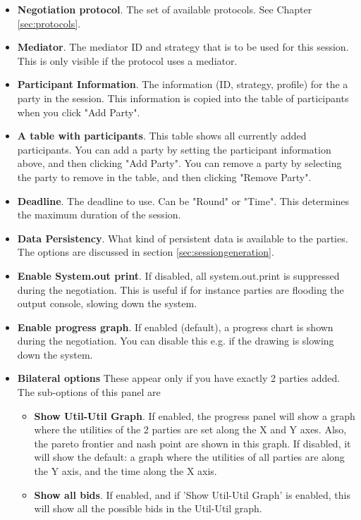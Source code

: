 \documentclass[]{article}
\begin{document}
\medskip
\begin{minipage}{.8 \textwidth}
\begin{itemize}
	\item \textbf{Negotiation protocol}. The set of available protocols. See Chapter \ref{sec:protocols}.
	\item \textbf{Mediator}. The mediator ID and strategy that is to be used for this session. This is only visible if the protocol uses a mediator.
	\item \textbf{Participant Information}. The information (ID, strategy, profile) for the a party in the session. This information is copied into the table of participants when you click "Add Party".
	\item \textbf{A table with participants}. This table shows all currently added participants. You can add a party by setting the participant information above, and then clicking "Add Party". You can remove a party by selecting the party to remove in the table, and then clicking "Remove Party". 
	\item \textbf{Deadline}. The deadline to use. Can be "Round" or "Time". This determines the maximum duration of the session.
	\item \textbf{Data Persistency}. What kind of persistent data is available to the parties. The options are discussed in section \ref{sec:sessiongeneration}.
	\item \textbf{Enable System.out print}. If disabled, all system.out.print is suppressed during the negotiation. This is useful if for instance parties are flooding the output console, slowing down the system.
		\item \textbf{Enable progress graph}. If enabled (default), a progress chart is shown during the negotiation. You can disable this e.g. if the drawing is slowing down the system.
\item \textbf{Bilateral options} These appear only if you have exactly 2 parties added. The sub-options of this panel are
	\begin{itemize}
	\item \textbf{Show Util-Util Graph}. If enabled, the progress panel will show a graph where the utilities of the 2 parties are set along the X and Y axes. Also, the pareto frontier and nash point are shown in this graph. If disabled, it will show the default: a graph where the utilities of all parties are along the Y axis, and the time along the X axis. 
	\item \textbf{Show all bids}.  If enabled, and if 'Show Util-Util Graph' is enabled, this will show all the possible bids in the Util-Util graph.
	\end{itemize}

\end{itemize}
\end{minipage}
\medskip
\end{document}
